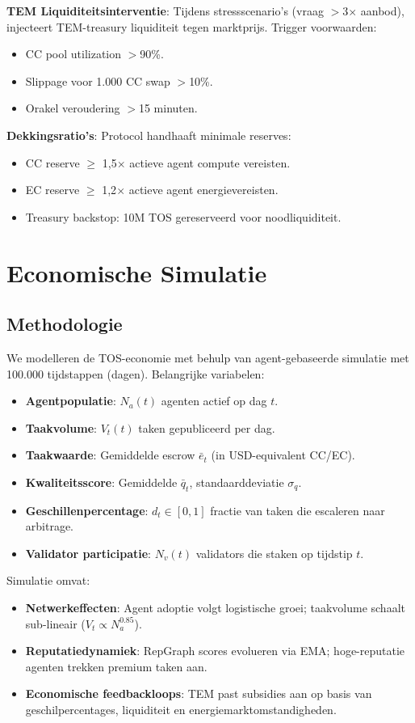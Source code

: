 \documentclass[11pt]{article}
\begin{document}
\textbf{TEM Liquiditeitsinterventie}: Tijdens stressscenario's (vraag $>$3$\times$ aanbod), injecteert TEM-treasury liquiditeit tegen marktprijs. Trigger voorwaarden:
\begin{itemize}[noitemsep]
  \item CC pool utilization $>$90\%.
  \item Slippage voor 1.000 CC swap $>$10\%.
  \item Orakel veroudering $>$15 minuten.
\end{itemize}

\textbf{Dekkingsratio's}: Protocol handhaaft minimale reserves:
\begin{itemize}[noitemsep]
  \item CC reserve $\geq$ 1,5$\times$ actieve agent compute vereisten.
  \item EC reserve $\geq$ 1,2$\times$ actieve agent energievereisten.
  \item Treasury backstop: 10M TOS gereserveerd voor noodliquiditeit.
\end{itemize}

\section{Economische Simulatie}
\label{sec:econ-sim}

\subsection{Methodologie}
We modelleren de TOS-economie met behulp van agent-gebaseerde simulatie met 100.000 tijdstappen (dagen). Belangrijke variabelen:
\begin{itemize}[noitemsep]
  \item \textbf{Agentpopulatie}: $N_a(t)$ agenten actief op dag $t$.
  \item \textbf{Taakvolume}: $V_t(t)$ taken gepubliceerd per dag.
  \item \textbf{Taakwaarde}: Gemiddelde escrow $\bar{e}_t$ (in USD-equivalent CC/EC).
  \item \textbf{Kwaliteitsscore}: Gemiddelde $\bar{q}_t$, standaarddeviatie $\sigma_q$.
  \item \textbf{Geschillenpercentage}: $d_t \in [0,1]$ fractie van taken die escaleren naar arbitrage.
  \item \textbf{Validator participatie}: $N_v(t)$ validators die staken op tijdstip $t$.
\end{itemize}
Simulatie omvat:
\begin{itemize}[noitemsep]
  \item \textbf{Netwerkeffecten}: Agent adoptie volgt logistische groei; taakvolume schaalt sub-lineair ($V_t \propto N_a^{0.85}$).
  \item \textbf{Reputatiedynamiek}: RepGraph scores evolueren via EMA; hoge-reputatie agenten trekken premium taken aan.
  \item \textbf{Economische feedbackloops}: TEM past subsidies aan op basis van geschilpercentages, liquiditeit en energiemarktomstandigheden.
\end{itemize}
\end{document}
